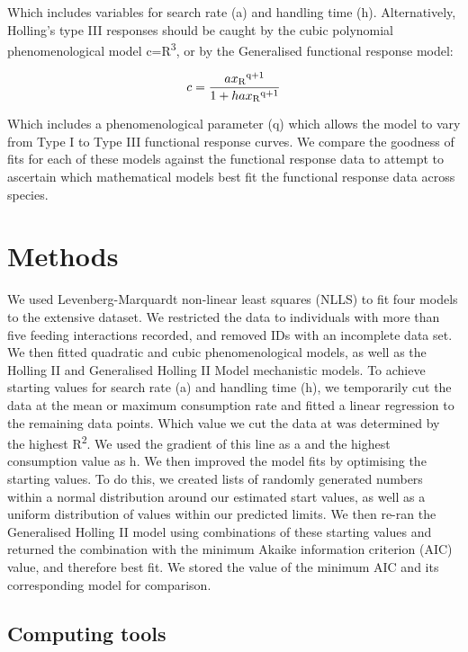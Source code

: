 \documentclass[11pt]{article}
\begin{document}
	Which includes variables for search rate (a) and handling time (h). Alternatively, Holling's type III responses should be caught by the cubic polynomial phenomenological model c=R\textsuperscript{3}, or by the Generalised functional response model:

	$$c=\frac{ax\textsubscript{R}\textsuperscript{q+1}}{1 + hax\textsubscript{R}\textsuperscript{q+1}}$$
	
	Which includes a phenomenological parameter (q) which allows the model to vary from Type I to Type III functional response curves. We compare the goodness of fits for each of these models against the functional response data to attempt to ascertain which mathematical models best fit the functional response data across species. 
	
	\section*{Methods}
	
	We used Levenberg-Marquardt non-linear least squares (NLLS) to fit four models to the extensive dataset. We restricted the data to individuals with more than five feeding interactions recorded, and removed IDs with an incomplete data set. We then fitted quadratic and cubic phenomenological models, as well as the Holling II and Generalised Holling II Model mechanistic models. To achieve starting values for search rate (a) and handling time (h), we temporarily cut the data at the mean or maximum consumption rate and fitted a linear regression to the remaining data points. Which value we cut the data at was determined by the highest R\textsuperscript{2}. We used the gradient of this line as a and the highest consumption value as h. We then improved the model fits by optimising the starting values. To do this, we created lists of randomly generated numbers within a normal distribution around our estimated start values, as well as a uniform distribution of values within our predicted limits. We then re-ran the Generalised Holling II model using combinations of these starting values and returned the combination with the minimum Akaike information criterion (AIC) value, and therefore best fit. We stored the value of the minimum AIC and its corresponding model for comparison.\\
	
	\subsection*{Computing tools}
	
\end{document}
